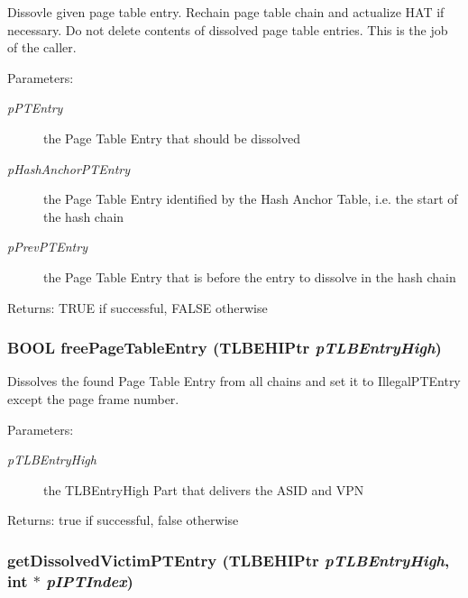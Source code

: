Dissovle given page table entry. Rechain page table chain and actualize HAT if necessary. Do not delete contents of dissolved page table entries. This is the job of the caller. \begin{Desc}
\item[Parameters:]
\begin{description}
\item[{\em pPTEntry}]the Page Table Entry that should be dissolved \item[{\em pHashAnchorPTEntry}]the Page Table Entry identified by the Hash Anchor Table, i.e. the start of the hash chain \item[{\em pPrevPTEntry}]the Page Table Entry that is before the entry to dissolve in the hash chain \end{description}
\end{Desc}
\begin{Desc}
\item[Returns:]TRUE if successful, FALSE otherwise \end{Desc}
\hypertarget{group___v_m_m___p_t_g85b6e33ff8a22b5c1e9e0b36e8f24c4c}{
\subsubsection[{freePageTableEntry}]{\setlength{\rightskip}{0pt plus 5cm}BOOL freePageTableEntry ({\bf TLBEHIPtr} {\em pTLBEntryHigh})}}
\label{group___v_m_m___p_t_g85b6e33ff8a22b5c1e9e0b36e8f24c4c}


Dissolves the found Page Table Entry from all chains and set it to IllegalPTEntry except the page frame number. \begin{Desc}
\item[Parameters:]
\begin{description}
\item[{\em pTLBEntryHigh}]the TLBEntryHigh Part that delivers the ASID and VPN \end{description}
\end{Desc}
\begin{Desc}
\item[Returns:]true if successful, false otherwise \end{Desc}
\hypertarget{group___v_m_m___p_t_g64821ed5828e71fb8cb12f99fffae069}{
\subsubsection[{getDissolvedVictimPTEntry}]{ getDissolvedVictimPTEntry ({\bf TLBEHIPtr} {\em pTLBEntryHigh}, \/  int $\ast$ {\em pIPTIndex})}}
\label{group___v_m_m___p_t_g64821ed5828e71fb8cb12f99fffae069}



